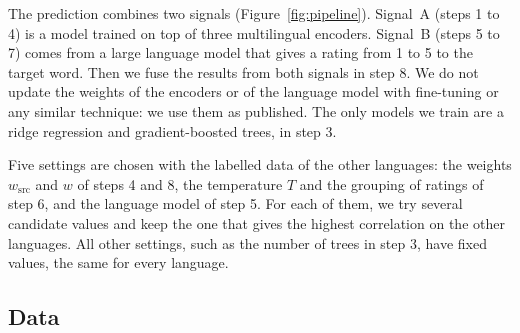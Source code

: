 The prediction combines two signals (Figure~\ref{fig:pipeline}). Signal~A (steps 1 to 4) is a model
trained on top of three multilingual encoders. Signal~B (steps 5 to 7) comes from a large language
model that gives a rating from 1 to 5 to the target word. Then we fuse the results from both signals
in step 8. We do not update the weights of the encoders or of the language model with fine-tuning or %
any similar technique: we use them as published. The only models we train are a ridge regression
and gradient-boosted trees, in step 3.

Five settings are chosen with the labelled data of the other languages: the weights $w_{\mathrm{src}}$ %
and $w$ of steps 4 and 8, the temperature $T$ and the grouping of ratings of step 6, and the language
model of step 5. For each of them, we try several candidate values and keep the one that gives the
highest correlation on the other languages. All other settings, such as the number of trees in
step 3, have fixed values, the same for every language.

\subsection{Data}
\label{sec:data}

